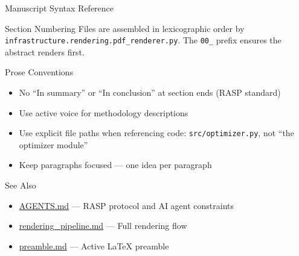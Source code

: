 \documentclass[
  ignorenonframetext,
]{beamer}
\providecommand{\tightlist}{%
  \setlength{\itemsep}{0pt}\setlength{\parskip}{0pt}}
\begin{document}
\begin{frame}[fragile]{Manuscript Syntax Reference}
\begin{block}{Section Numbering}
Files are assembled in lexicographic order by
\texttt{infrastructure.rendering.pdf\_renderer.py}. The \texttt{00\_}
prefix ensures the abstract renders first.
\end{block}

\begin{block}{Prose Conventions}
\protect{}\label{prose-conventions}
\begin{itemize}
\tightlist
\item
  No ``In summary'' or ``In conclusion'' at section ends (RASP standard)
\item
  Use active voice for methodology descriptions
\item
  Use explicit file paths when referencing code:
  \texttt{src/optimizer.py}, not ``the optimizer module''
\item
  Keep paragraphs focused --- one idea per paragraph
\end{itemize}
\end{block}

\begin{block}{See Also}
\protect{}\label{see-also}
\begin{itemize}
\tightlist
\item
  \url{AGENTS.md} --- RASP protocol and AI agent constraints
\item
  \href{../docs/rendering_pipeline.md}{rendering\_pipeline.md} --- Full
  rendering flow
\item
  \url{preamble.md} --- Active LaTeX preamble
\end{itemize}
\end{block}
\end{frame}
\end{document}
